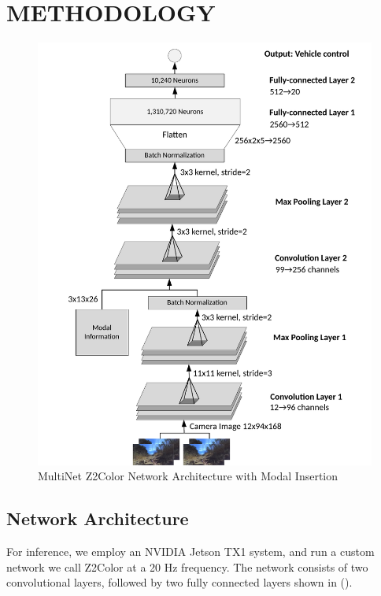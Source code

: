 \section{METHODOLOGY}
\label{sec:approach}

\begin{figure}[t]
   \centering
   \includegraphics[width=\columnwidth,trim=0 0 20 0,clip]{paper/content/images/z2color}
   \caption{MultiNet Z2Color Network Architecture with Modal Insertion}
   \label{fig:squeeze}
\end{figure}

\subsection{Network Architecture}
For inference, we employ an NVIDIA Jetson TX1 system, and run a custom network we call Z2Color at a 20 Hz frequency. The network consists of two convolutional layers, followed by two fully connected layers shown in ().

